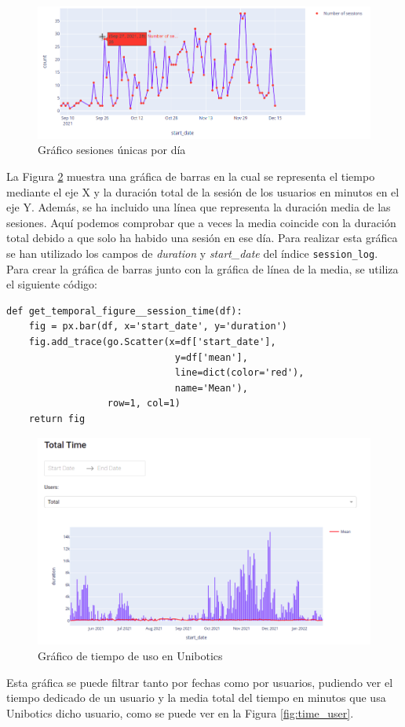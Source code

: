 \begin{figure}[H]
    \centering
    \includegraphics[width=16cm, keepaspectratio]{img/sesion_users.png}
    \caption{Gráfico sesiones únicas por día}
    \label{fig:sesion_users}
\end{figure}
\newpage
La Figura \ref{fig:time} muestra una gráfica de barras en la cual se representa el tiempo mediante el eje X y la duración total de la sesión de los usuarios en minutos en el eje Y. Además, se ha incluido una línea que representa la duración media de las sesiones. Aquí podemos comprobar que a veces la media coincide con la duración total debido a que solo ha habido una sesión en ese día. Para realizar esta gráfica se han utilizado los campos de \textit{duration} y \textit{start\_date} del índice \texttt{session\_log}. Para crear la gráfica de barras junto con la gráfica de línea de la media, se utiliza el siguiente código:

\begin{lstlisting}
def get_temporal_figure__session_time(df):
    fig = px.bar(df, x='start_date', y='duration')
    fig.add_trace(go.Scatter(x=df['start_date'], 
                              y=df['mean'], 
                              line=dict(color='red'), 
                              name='Mean'),
                  row=1, col=1)
    return fig
\end{lstlisting}

\begin{figure}[H]
    \centering
    \includegraphics[width=16cm, keepaspectratio]{img/time.png}
    \caption{Gráfico de tiempo de uso en Unibotics}
    \label{fig:time}
\end{figure}
Esta gráfica se puede filtrar tanto por fechas como por usuarios, pudiendo ver el tiempo dedicado de un usuario y la media total del tiempo en minutos que usa Unibotics dicho usuario, como se puede ver en la Figura \ref{fig:time_user}.

